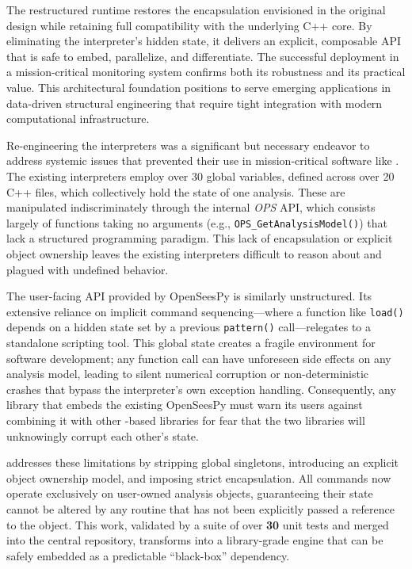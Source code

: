 The restructured runtime restores the encapsulation envisioned in the original \OpenSees{} design while retaining full compatibility with the underlying C++ core. 
By eliminating the interpreter's hidden state, it delivers an explicit, composable API that is safe to embed, parallelize, and differentiate. 
The successful deployment in a mission-critical monitoring system confirms both its robustness and its practical value. 
This architectural foundation positions \OpenSees{} to serve emerging applications in data-driven structural engineering that require tight integration with modern computational infrastructure.


Re-engineering the \OpenSees{} interpreters was a significant but necessary endeavor to address systemic issues that prevented their use in mission-critical software like \BRACE{}. 
The existing interpreters employ over 30 global variables, defined across over 20 C++ files, which collectively hold the state of one analysis. These are manipulated indiscriminately through the internal \emph{OPS} API, which consists largely of functions taking no arguments (e.g., \texttt{OPS\_GetAnalysisModel()}) that lack a structured programming paradigm. 
This lack of encapsulation or explicit object ownership leaves the existing interpreters difficult to reason about and plagued with undefined behavior.

The user-facing API provided by OpenSeesPy is similarly unstructured. 
Its extensive reliance on implicit command sequencing—where a function like \texttt{load()} depends on a hidden state set by a previous \texttt{pattern()} call—relegates \OpenSees{} to a standalone scripting tool. 
This global state creates a fragile environment for software development; any function call can have unforeseen side effects on any analysis model, leading to silent numerical corruption or non-deterministic crashes that bypass the interpreter's own exception handling. Consequently, any library that embeds the existing OpenSeesPy must warn its users against combining it with other \OpenSees{}-based libraries for fear that the two libraries will unknowingly corrupt each other's state.

\Xara{} addresses these limitations by stripping global singletons, introducing an explicit object ownership model, and imposing strict encapsulation. 
All commands now operate exclusively on user-owned analysis objects, guaranteeing their state cannot be altered by any routine that has not been explicitly passed a reference to the object. This work, validated by a suite of over \textbf{30} unit tests and merged into the central \OpenSees{} repository, transforms \OpenSees{} into a library-grade engine that can be safely embedded as a predictable ``black-box'' dependency.
